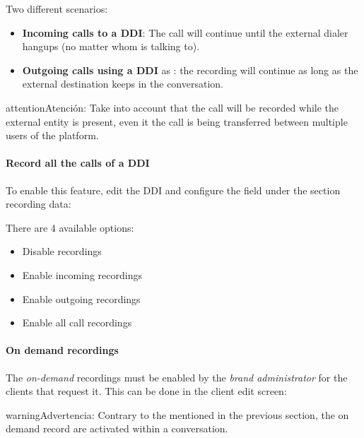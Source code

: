 \documentclass[letterpaper,10pt,spanish]{sphinxmanual}
\begin{document}
Two different scenarios:
\begin{itemize}
\item {} 
\textbf{Incoming calls to a DDI}: The call will continue until the external
dialer hangups (no matter whom is talking to).

\item {} 
\textbf{Outgoing calls using a DDI} as {\hyperref[administration_portal/client/vpbx/ddis:ddis]{}}: the
recording will continue as long as the external destination keeps in the
conversation.

\end{itemize}

\begin{notice}{attention}{Atención:}
Take into account that the call will be recorded while the
external entity is present, even it the call is being transferred between
multiple users of the platform.
\end{notice}
\paragraph{Record all the calls of a DDI}

To enable this feature, edit the DDI and configure the field under the section
recording data:

There are 4 available options:
\begin{itemize}
\item {} 
Disable recordings

\item {} 
Enable incoming recordings

\item {} 
Enable outgoing recordings

\item {} 
Enable all call recordings

\end{itemize}


\paragraph{On demand recordings}
\label{administration_portal/client/residential/calls/call_recordings:on-demand-recordings}
The \emph{on-demand} recordings must be enabled by the \emph{brand administrator} for the
clients that request it. This can be done in the client edit screen:

\begin{notice}{warning}{Advertencia:}
Contrary to the {\hyperref[administration_portal/platform/services:services]{}} mentioned in the
previous section, the on demand record are activated within a conversation.
\end{notice}
\end{document}
